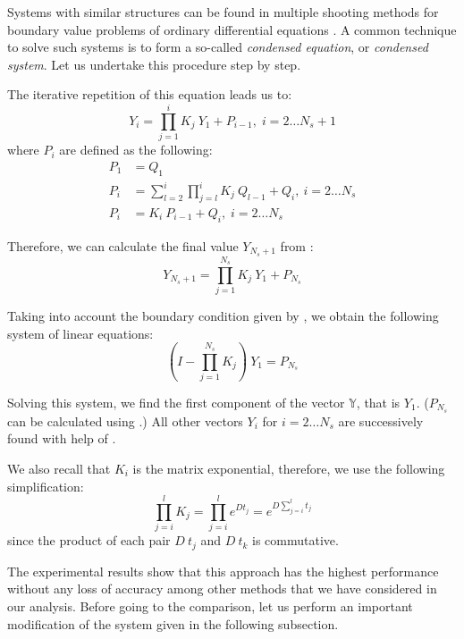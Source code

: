 Systems with similar structures can be found in multiple shooting methods for boundary value problems of ordinary differential equations \cite{stoer2002}. A common technique to solve such systems is to form a so-called \emph{condensed equation}, or \emph{condensed system}. Let us undertake this procedure step by step.

The iterative repetition of this equation leads us to:
\begin{equation} \label{eq:y-recurrent}
  Y_i = \prod_{j = 1}^{i} K_j \: Y_1 + P_{i - 1}, \; i = 2 \dots N_s + 1
\end{equation}
where $P_i$ are defined as the following:
\begin{align}
  P_1 & = Q_1 \nonumber \\
  P_i & = \sum_{l = 2}^i \prod_{j = l}^i K_j \: Q_{l - 1} + Q_i, \: i = 2 \dots N_s \nonumber \\
  P_i & = K_i \: P_{i - 1} + Q_i, \; i = 2 \dots N_s \label{eq:p-recurrent}
\end{align}

Therefore, we can calculate the final value $Y_{N_s + 1}$ from :
\[
  Y_{N_s + 1} = \prod_{j = 1}^{N_s} K_j \: Y_1 + P_{N_s}
\]

Taking into account the boundary condition given by , we obtain the following system of linear equations:
\[
  (I - \prod_{j = 1}^{N_s} K_j) \: Y_1 = P_{N_s}
\]

Solving this system, we find the first component of the vector $\mathbb{Y}$, that is $Y_1$. ($P_{N_s}$ can be calculated using .) All other vectors $Y_i$ for $i = 2 \dots N_s$ are successively found with help of .

We also recall that $K_i$ is the matrix exponential, therefore, we use the following simplification:
\[
  \prod_{j = i}^l K_j = \prod_{j = i}^l e^{D t_j} = e^{D \sum_{j = i}^l t_j}
\]
since the product of each pair $D \: t_j$ and $D \: t_k$ is commutative.

The experimental results show that this approach has the highest performance without any loss of accuracy among other methods that we have considered in our analysis. Before going to the comparison, let us perform an important modification of the system given in the following subsection.

